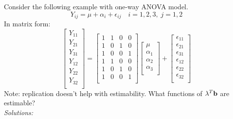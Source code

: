 Consider the following example with one-way ANOVA model.
$$
Y_{ij} = \mu + \alpha_i + \epsilon_{ij} \quad i=1, 2, 3, \; j=1, 2
$$
In matrix form:
$$
\left[\begin{array}{c}
	Y_{11}\\
	Y_{21}\\
	Y_{31}\\
	Y_{12}\\
	Y_{22}\\
	Y_{32}\\
\end{array}\right] = \left[ \begin{array}{cccc}
1 & 1  & 0 & 0\\
1 & 0  & 1 & 0\\
1 & 0  & 0 & 1\\
1 & 1  & 0 & 0\\
1 & 0  & 1 & 0\\
1 & 0  & 0 & 1\\
\end{array}	\right] \left[\begin{array}{c}
\mu \\
\alpha_1 \\
\alpha_2 \\
\alpha_3 \\
\end{array}\right] + 
\left[\begin{array}{c}
	\epsilon_{11}\\
	\epsilon_{21}\\
	\epsilon_{31}\\
	\epsilon_{12}\\
	\epsilon_{22}\\
	\epsilon_{32}\\
\end{array}\right]
$$
Note: replication doesn't help with estimability. What functions of $\mathbf{\lambda}^T \mathbf{b}$ are estimable?\\
{\it Solutions:}
